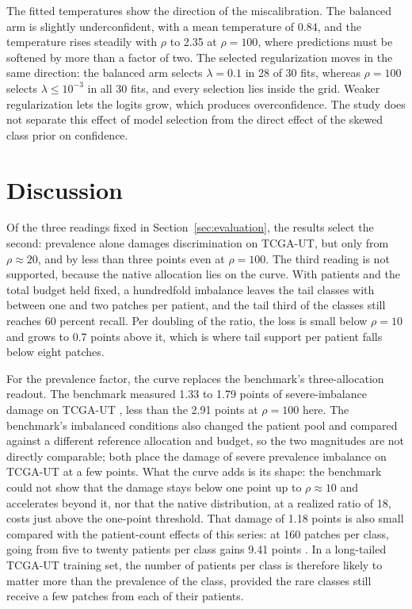 The fitted temperatures show the direction of the miscalibration. The balanced arm is slightly underconfident, with a mean temperature of 0.84, and the temperature rises steadily with $\rho$ to 2.35 at $\rho=100$, where predictions must be softened by more than a factor of two. The selected regularization moves in the same direction: the balanced arm selects $\lambda=0.1$ in 28 of 30 fits, whereas $\rho=100$ selects $\lambda\leq10^{-3}$ in all 30 fits, and every selection lies inside the grid. Weaker regularization lets the logits grow, which produces overconfidence. The study does not separate this effect of model selection from the direct effect of the skewed class prior on confidence.

\section{Discussion}
\label{sec:discussion}
Of the three readings fixed in Section~\ref{sec:evaluation}, the results select the second: prevalence alone damages discrimination on TCGA-UT, but only from $\rho\approx20$, and by less than three points even at $\rho=100$. The third reading is not supported, because the native allocation lies on the curve. With patients and the total budget held fixed, a hundredfold imbalance leaves the tail classes with between one and two patches per patient, and the tail third of the classes still reaches 60 percent recall. Per doubling of the ratio, the loss is small below $\rho=10$ and grows to 0.7 points above it, which is where tail support per patient falls below eight patches.

For the prevalence factor, the curve replaces the benchmark's three-allocation readout. The benchmark measured 1.33 to 1.79 points of severe-imbalance damage on TCGA-UT \citep{queisler2026benchmarkResults}, less than the 2.91 points at $\rho=100$ here. The benchmark's imbalanced conditions also changed the patient pool and compared against a different reference allocation and budget, so the two magnitudes are not directly comparable; both place the damage of severe prevalence imbalance on TCGA-UT at a few points. What the curve adds is its shape: the benchmark could not show that the damage stays below one point up to $\rho\approx10$ and accelerates beyond it, nor that the native distribution, at a realized ratio of 18, costs just above the one-point threshold. That damage of 1.18 points is also small compared with the patient-count effects of this series: at 160 patches per class, going from five to twenty patients per class gains 9.41 points \citep{queisler2026centreError}. In a long-tailed TCGA-UT training set, the number of patients per class is therefore likely to matter more than the prevalence of the class, provided the rare classes still receive a few patches from each of their patients.

